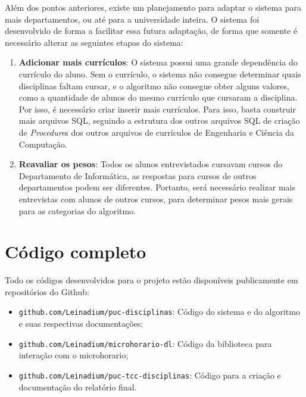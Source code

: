 Além dos pontos anteriores, existe um planejamento para adaptar o sistema para mais departamentos, ou até para a universidade inteira. O sistema foi desenvolvido de forma a facilitar essa futura adaptação, de forma que somente é necessário alterar as seguintes etapas do sistema:

\begin{enumerate}
    \item \textbf{Adicionar mais currículos}: O sistema possui uma grande dependência do currículo do aluno. Sem o currículo, o sistema não consegue determinar quais disciplinas faltam cursar, e o algoritmo não consegue obter alguns valores, como a quantidade de alunos do mesmo currículo que cursaram a disciplina. Por isso, é necessário criar inserir mais currículos. Para isso, basta construir mais arquivos SQL, seguindo a estrutura dos outros arquivos SQL de criação de \textit{Procedure}s dos outros arquivos de currículos de Engenharia e Ciência da Computação.
    \item \textbf{Reavaliar os pesos}: Todos os alunos entrevistados cursavam cursos do Departamento de Informática, as respostas para cursos de outros departamentos podem ser diferentes. Portanto, será necessário realizar mais entrevistas com alunos de outros cursos, para determinar pesos mais gerais para as categorias do algoritmo.
\end{enumerate}

\section{Código completo}


Todo os códigos desenvolvidos para o projeto estão disponíveis publicamente em repositórios do Github:

\begin{itemize}
    \item \verb|github.com/Leinadium/puc-disciplinas|: Código do sistema e do algoritmo e suas respectivas documentações;
    \item \verb|github.com/Leinadium/microhorario-dl|: Código da biblioteca para interação com o microhorario;
    \item \verb|github.com/Leinadium/puc-tcc-disciplinas|: Código para a criação e documentação do relatório final.
\end{itemize}